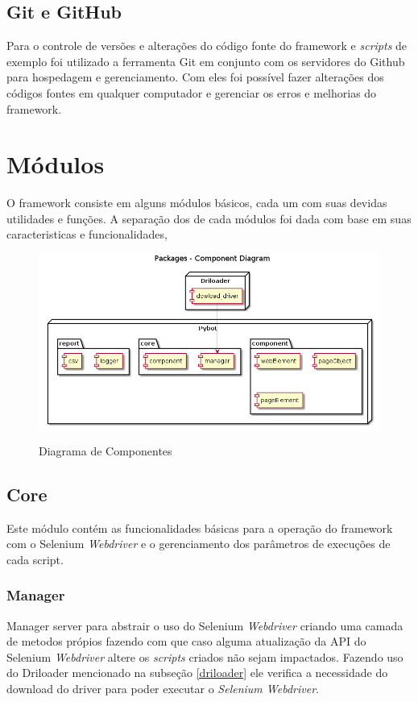         \subsection{Git e GitHub}
            Para o controle de versões e alterações do código fonte do framework e \emph{scripts} de exemplo foi utilizado a ferramenta
            Git \cite{git} em conjunto com os servidores do Github \cite{github} para hospedagem e gerenciamento. Com eles foi possível
            fazer alterações dos códigos fontes em qualquer computador e gerenciar os erros e melhorias do framework.


    \section{Módulos}

        O framework consiste em alguns módulos básicos, cada um com suas devidas utilidades e funções.
        A separação dos de cada módulos foi dada com base em suas caracteristicas e funcionalidades,

        \begin{figure}[H]
            \vspace*{0,3cm}
            \centering
            \caption{Diagrama de Componentes}
            \includegraphics[width=1\textwidth]{./04-figuras/model}
            \label{fig:modules}
        \end{figure}

        \subsection{Core}
            Este módulo contém as funcionalidades básicas para a operação do framework com o Selenium \emph{Webdriver}
            e o gerenciamento dos parâmetros de execuções de cada script.

            \subsubsection{Manager}
            Manager server para abstrair o uso do Selenium \emph{Webdriver} criando uma camada de metodos própios fazendo com que caso alguma
            atualização da API do Selenium \emph{Webdriver} altere os \emph{scripts} criados não sejam impactados. Fazendo uso do Driloader mencionado na
            subseção \ref{driloader} ele verifica a necessidade do download do driver para poder executar o \emph{Selenium Webdriver}.

